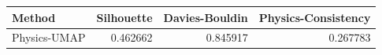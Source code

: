 \begin{tabular}{lrrr}
\toprule
Method & Silhouette & Davies-Bouldin & Physics-Consistency \\
\midrule
Physics-UMAP & 0.462662 & 0.845917 & 0.267783 \\
\bottomrule
\end{tabular}
